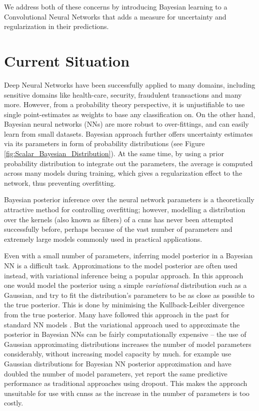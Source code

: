 We address both of these concerns by introducing Bayesian learning to a Convolutional Neural Networks that adds a measure for uncertainty and regularization in their predictions. 

\section{Current Situation}

Deep Neural Networks have been successfully applied to many domains, including sensitive domains like health-care, security, fraudulent transactions and many more. However, from a probability theory perspective, it is unjustifiable to use single point-estimates as weights to base any classification on.
On the other hand, Bayesian neural networks (NNs) are more robust to over-fittings, and can easily learn from small datasets. Bayesian approach further offers uncertainty estimates via its parameters in form of probability distributions (see Figure \ref{fig:Scalar_Bayesian_Distribution}). At the same time, by using a prior probability distribution to integrate out the parameters, the average is computed across many models during training, which gives a regularization effect to the network, thus preventing overfitting.


Bayesian posterior inference over the neural network parameters is a theoretically attractive method for controlling overfitting; however, modelling a distribution over the kernels (also known as filters) of a \acp{cnn} has never been attempted successfully before, perhaps because of the vast number of parameters and extremely large models commonly used in practical applications.

Even with a small number of parameters, inferring model posterior in a Bayesian NN is a difficult task. Approximations to the model posterior are often used instead, with variational inference being a popular approach. In this approach one would model the posterior using a simple \textit{variational} distribution such as a Gaussian, and try to fit the distribution's parameters to be as close as possible to the true posterior. This is done by minimising the Kullback-Leibler divergence from the true posterior. Many have followed this approach in the past for standard NN models \citep{hinton1993keeping,barber1998ensemble,graves2011practical,blundell2015weight}.
But the variational approach used to approximate the posterior in Bayesian NNs can be fairly computationally expensive -- the use of Gaussian approximating distributions increases the number of model parameters considerably, without increasing model capacity by much. \citet{blundell2015weight} for example use Gaussian distributions for Bayesian NN posterior approximation and have doubled the number of model parameters, yet report the same predictive performance as traditional approaches using dropout. This makes the approach unsuitable for use with \acp{cnn}s as the increase in the number of parameters is too costly.

